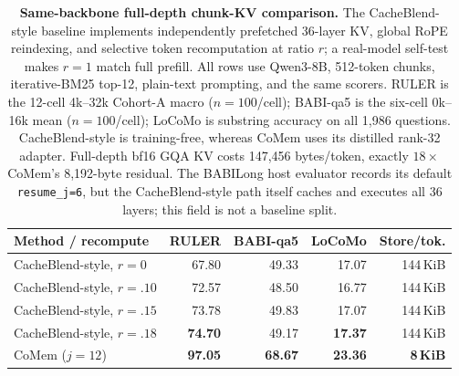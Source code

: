 \begin{table}[!t]
\centering
\scriptsize
\setlength{\tabcolsep}{3.2pt}
\begin{tabular}{@{}lrrrr@{}}
\toprule
\textbf{Method / recompute} & \textbf{RULER} & \textbf{BABI-qa5} &
\textbf{LoCoMo} & \textbf{Store/tok.} \\
\midrule
CacheBlend-style, $r{=}0$    & 67.80 & 49.33 & 17.07 & 144\,KiB \\
CacheBlend-style, $r{=}.10$  & 72.57 & 48.50 & 16.77 & 144\,KiB \\
CacheBlend-style, $r{=}.15$  & 73.78 & 49.83 & 17.07 & 144\,KiB \\
CacheBlend-style, $r{=}.18$  & \textbf{74.70} & 49.17 & \textbf{17.37} & 144\,KiB \\
\midrule
CoMem ($j{=}12$) & \textbf{97.05} & \textbf{68.67} & \textbf{23.36} & \textbf{8\,KiB} \\
\bottomrule
\end{tabular}
\caption{\textbf{Same-backbone full-depth chunk-KV comparison.}
The CacheBlend-style baseline implements independently prefetched 36-layer KV,
global RoPE reindexing, and selective token recomputation at ratio $r$; a
real-model self-test makes $r{=}1$ match full prefill. All rows use Qwen3-8B,
512-token chunks, iterative-BM25 top-12, plain-text prompting, and the same
scorers. RULER is the 12-cell 4k--32k Cohort-A macro ($n{=}100$/cell);
BABI-qa5 is the six-cell 0k--16k mean ($n{=}100$/cell); LoCoMo is substring
accuracy on all 1,986 questions. CacheBlend-style is training-free, whereas
CoMem uses its distilled rank-32 adapter. Full-depth bf16 GQA KV costs
147,456 bytes/token, exactly $18\times$ CoMem's 8,192-byte residual.
The BABILong host evaluator records its default \texttt{resume\_j=6}, but the
CacheBlend-style path itself caches and executes all 36 layers; this field is
not a baseline split.}
\label{tab:cacheblend-baseline}
\end{table}
